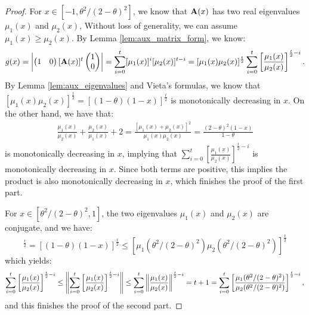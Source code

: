 \begin{proof}
For $x \in [-1, \theta^2/(2-\theta)^2]$, we know that $\mathbf{A}(x)$ has two 
real eigenvalues $\mu_1(x)$ and $\mu_2(x)$, Without loss of generality, 
we can assume $\mu_1(x) \ge \mu_2(x)$.
By Lemma \ref{lem:aux_matrix_form}, we know:
\begin{align*}
g(x) = \left|{\begin{pmatrix} 1 & 0  \end{pmatrix}[\mathbf{A}(x)]^{t}\begin{pmatrix} 1 \\ 0  \end{pmatrix}}\right|
=\sum_{i=0}^t [\mu_1(x)]^i [\mu_2(x)]^{t-i}
= [\mu_1(x)\mu_2(x)]^{\frac{t}{2}} \sum_{i=0}^t \left[\frac{\mu_1(x)}{\mu_2(x)}\right]^{\frac{t}{2} - i}.
\end{align*}
By Lemma \ref{lem:aux_eigenvalues} and Vieta's formulas, 
we know that $[\mu_1(x)\mu_2(x)]^{\frac{t}{2}} 
= [(1-\theta) (1 - x)]^{\frac{t}{2}}$ is monotonically decreasing in $x$.
On the other hand, we have that:
\begin{align*}
\frac{\mu_1(x)}{\mu_2(x)} + \frac{\mu_2(x)}{\mu_1(x)}
+ 2 = \frac{[\mu_1(x) + \mu_2(x)]^2}{\mu_1(x)\mu_2(x)}
= \frac{(2-\theta)^2(1-x)}{1-\theta}
\end{align*}
is monotonically decreasing in $x$, implying that 
$\sum_{i=0}^t \left[\frac{\mu_1(x)}{\mu_2(x)}\right]^{\frac{t}{2} - i}$ 
is monotonically decreasing in $x$. Since both terms are positive, 
this implies the product is also monotonically decreasing in $x$, 
which finishes the proof of the first part.

For $x \in [\theta^2/(2-\theta)^2, 1]$, the two eigenvalues 
$\mu_1(x)$ and $\mu_2(x)$ are conjugate, and we have:
\begin{equation*}
[\mu_1(x)\mu_2(x)]^{\frac{t}{2}} = [(1-\theta) (1 - x)]^{\frac{t}{2}} \le [\mu_1(\theta^2/(2-\theta)^2)\mu_2(\theta^2/(2-\theta)^2)]^{\frac{t}{2}}
\end{equation*}
which yields:
\begin{equation*}
\sum_{i=0}^t \left[\frac{\mu_1(x)}{\mu_2(x)}\right]^{\frac{t}{2} - i}
\le \left\|{\sum_{i=0}^t \left[\frac{\mu_1(x)}{\mu_2(x)}\right]^{\frac{t}{2} - i}}\right\|
\le \sum_{i=0}^t \left\|{\frac{\mu_1(x)}{\mu_2(x)}}\right\|^{\frac{t}{2} - i}
=t+1
= \sum_{i=0}^t \left[\frac{\mu_1(\theta^2/(2-\theta)^2)}{\mu_2(\theta^2/(2-\theta)^2)}\right]^{\frac{t}{2} - i},
\end{equation*}
and this finishes the proof of the second part.
\end{proof}

